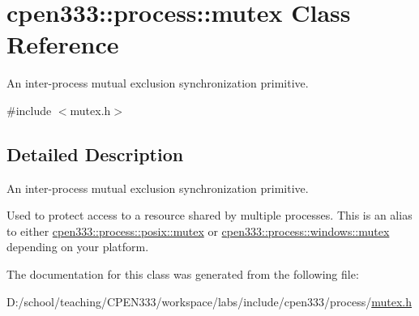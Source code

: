 \hypertarget{classcpen333_1_1process_1_1mutex}{}\section{cpen333\+:\+:process\+:\+:mutex Class Reference}
\label{classcpen333_1_1process_1_1mutex}


An inter-\/process mutual exclusion synchronization primitive.  




{\ttfamily \#include $<$mutex.\+h$>$}



\subsection{Detailed Description}
An inter-\/process mutual exclusion synchronization primitive. 

Used to protect access to a resource shared by multiple processes. This is an alias to either \hyperlink{classcpen333_1_1process_1_1posix_1_1mutex}{cpen333\+::process\+::posix\+::mutex} or \hyperlink{classcpen333_1_1process_1_1windows_1_1mutex}{cpen333\+::process\+::windows\+::mutex} depending on your platform. 

The documentation for this class was generated from the following file\+:\begin{DoxyCompactItemize}
\item 
D\+:/school/teaching/\+C\+P\+E\+N333/workspace/labs/include/cpen333/process/\hyperlink{mutex_8h}{mutex.\+h}\end{DoxyCompactItemize}
